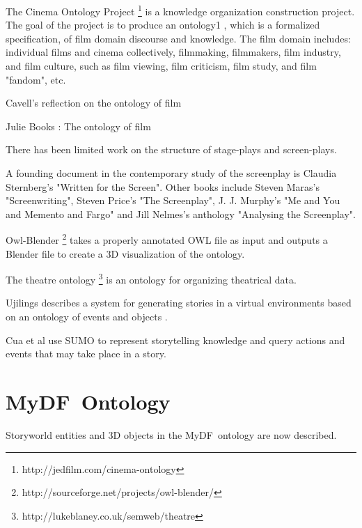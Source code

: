 \documentclass[a4paper,UKenglish]{oasics}
\newcommand{\mydf}{MyDF}
\begin{document}
The Cinema Ontology Project \footnote{http://jedfilm.com/cinema-ontology}
is a knowledge organization construction project. The goal of the project is to produce an ontology1 , which is a formalized specification, of film domain discourse and knowledge. The film domain includes: individual films and cinema collectively, filmmaking, filmmakers, film industry, and film culture, such as film viewing, film criticism, film study, and film "fandom", etc.  

Cavell's reflection on the ontology of film

Julie Books : The ontology of film

There has been limited work on the structure of stage-plays and screen-plays. 

A founding document in the contemporary study of the screenplay is Claudia Sternberg's "Written for the Screen".
Other books include Steven Maras's "Screenwriting", Steven Price's  "The Screenplay",  J. J. Murphy's "Me 
and You and Memento and Fargo" and Jill Nelmes's anthology "Analysing the Screenplay". 





Owl-Blender \footnote{http://sourceforge.net/projects/owl-blender/} takes a properly annotated OWL file as input and outputs a Blender file to create a 3D visualization of the ontology.

The theatre ontology \footnote{http://lukeblaney.co.uk/semweb/theatre} is an ontology for organizing theatrical data.


Ujilings describes a system for generating stories in a virtual environments
based on an ontology of events and objects \cite{Uijlings06}.

Cua et al \cite{Cua10} use SUMO to represent storytelling knowledge and 
query actions and events that may take place in a story.

\section{\mydf\ Ontology}
Storyworld entities and 3D objects in the \mydf\ ontology are now described.
\end{document}
